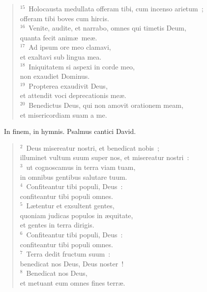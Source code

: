 \begin{flushleft}
\begin{verse}
${}^{15}$~Holocausta medullata offeram tibi, cum incenso arietum~;\\ offeram tibi boves cum hircis.\\
${}^{16}$~Venite, audite, et narrabo, omnes qui timetis Deum,\\ quanta fecit anim\ae\ me\ae .\\
${}^{17}$~Ad ipsum ore meo clamavi,\\ et exaltavi sub lingua mea.\\
${}^{18}$~Iniquitatem si aspexi in corde meo,\\ non exaudiet Dominus.\\
${}^{19}$~Propterea exaudivit Deus,\\ et attendit voci deprecationis me\ae .\\
${}^{20}$~Benedictus Deus, qui non amovit orationem meam,\\ et misericordiam suam a me.\end{verse}\end{flushleft}


~\lettrine[lines=10,image=true,loversize=0.05,lraise=-0.03]{I}{}n finem, in hymnis. Psalmus cantici David.
\begin{flushleft}\begin{verse}\vspace{6pt}${}^{2}$~Deus misereatur nostri, et benedicat nobis~;\\ illuminet vultum suum super nos, et misereatur nostri~:\\
${}^{3}$~ut cognoscamus in terra viam tuam,\\ in omnibus gentibus salutare tuum.\\
${}^{4}$~Confiteantur tibi populi, Deus~:\\ confiteantur tibi populi omnes.\\
${}^{5}$~L\ae tentur et exsultent gentes,\\ quoniam judicas populos in \ae quitate,\\ et gentes in terra dirigis.\\
${}^{6}$~Confiteantur tibi populi, Deus~:\\ confiteantur tibi populi omnes.\\
${}^{7}$~Terra dedit fructum suum~:\\ benedicat nos Deus, Deus noster~!\\
${}^{8}$~Benedicat nos Deus,\\ et metuant eum omnes fines terr\ae .\end{verse}\end{flushleft}


